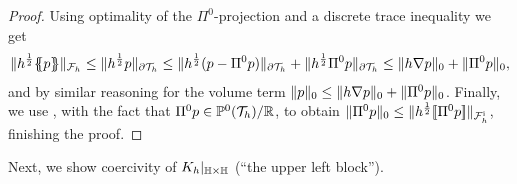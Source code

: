 \documentclass[pdflatex,sn-mathphys,Numbered]{sn-jnl}%
\theoremstyle{remark}%
\theoremstyle{definition}%
\begin{document}
\begin{proof}
    Using optimality of the $\Pi^0$-projection and a discrete trace inequality we get
    \begin{align*}
        \Vert h^{\frac12}\{\!\!\{ p\}\!\!\} \Vert_{{\mathcal{F}_h}} \leq \Vert h^{\frac12}p \Vert_{\partial {\mathcal{T}_h}} \leq \Vert h^{\frac12}(p-\Pi^0 p) \Vert_{\partial {\mathcal{T}_h}} + \Vert h^{\frac12}\Pi^0p \Vert_{\partial {\mathcal{T}_h}} \leq \Vert h\nabla p \Vert_0+ \Vert \Pi^0p \Vert_{0},
    \end{align*}
    and by similar reasoning for the volume term $ \nrm{p}_0%
    \leq \nrm{h \nabla p}_{0} + \nrm{\Pi^0 p}_0$.
    Finally, we use \cite[Remark 1.1]{brenner2003poincare}, with the fact that $\Pi^0 p \in \mathbb{P}^0({\mathcal{T}_h})/ \mathbb{R}$, to obtain
    $\Vert \Pi^0 p \Vert_0 \leq \Vert h^{\frac12}[\![\Pi^0 p]\!] \Vert_{{\mathcal{F}_h^{\text{i}}}}$, finishing the proof.
\end{proof}

Next, we show coercivity of $K_h|_{\mathbb{H} \times \mathbb{H}}$ (``the upper left
block''). 
\end{document}
